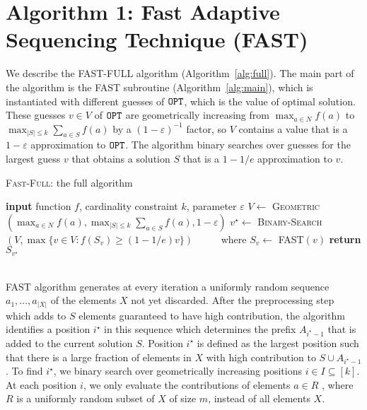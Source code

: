\documentclass[11pt, a4paper]{article}
\begin{document}
\section{Algorithm 1: Fast Adaptive Sequencing Technique (\textsc{FAST})} 
We describe the \textsc{FAST-FULL} algorithm (Algorithm~\ref{alg:full}). The main part of the algorithm is the \textsc{FAST} subroutine (Algorithm~\ref{alg:main}), which is instantiated with different guesses of $\texttt{OPT}$, which is the value of optimal solution. These guesses $v \in V$ of $\texttt{OPT}$ are geometrically increasing from $\max_{a \in N} f(a)$ to $\max_{|S| \leq k} \sum_{a \in S} f(a)$ by a $(1 - \varepsilon)^{-1}$ factor, so $V$ contains a value that is a $1- \varepsilon$ approximation to $\texttt{OPT}$. The algorithm binary searches over guesses for the largest guess $v$ that obtains a solution $S$ that is a $1-1/e$ approximation to $v$.
\begin{algorithm}[H]
\caption{\textsc{Fast-Full}: the full algorithm}
\begin{algorithmic}
    	\STATE \textbf{input} function $f$, cardinality constraint $k$, parameter $\varepsilon$
    	\STATE $V \leftarrow$ \textsc{Geometric}$(\max_{a \in N} f(a), \max_{|S| \leq k} \sum_{a \in S} f(a), 1 - \varepsilon)$
    	\STATE $v^{\star} \leftarrow$ \textsc{Binary-Search}$(V, \max\{v \in V: f(S_v) \geq (1 - 1/e)v\})$
    	\STATE \ \ \ \ \ where $S_v \leftarrow$ \textsc{FAST}$(v)$
    	\STATE \textbf{return} $S_{v^{\star}}$ 
  \end{algorithmic}
  \label{alg:full}
\end{algorithm}
\\
\textsc{FAST} algorithm generates at every iteration a  uniformly random sequence $a_1, \ldots, a_{|X|}$ of the elements $X$ not yet discarded. After the preprocessing step which adds to $S$ elements guaranteed to have high contribution, the  algorithm  identifies a position $i^{\star}$ in this sequence which determines the prefix $A_{i^{\star} - 1}$ that is added to the current solution $S$. Position $i^{\star}$ is defined as the largest position such that there is a large fraction of elements in $X$ with high contribution to $S \cup A_{i^{\star} - 1}$. To find $i^{\star}$, we binary search over geometrically increasing positions $i \in I \subseteq [k]$. At each position $i$, we only evaluate the contributions of elements $a \in R$ , where $R$ is a uniformly random subset of $X$ of size $m$, instead of all elements $X$.  
\end{document}
